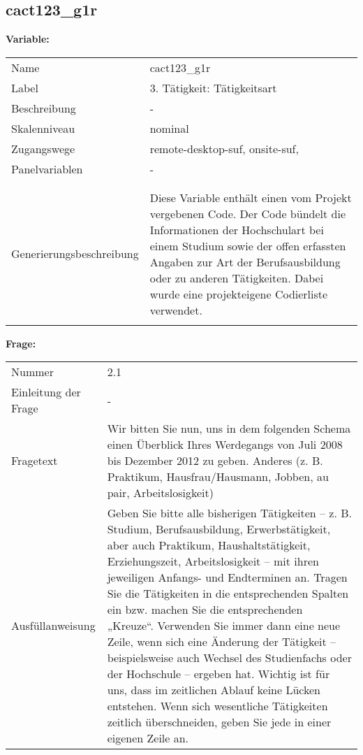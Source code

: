 	
	
	\subsection{cact123\_g1r}
	\label{subSection:cact123_g1r}

	\noindent\textbf{Variable:}\\
		\begin{tabular}{lL{11.3cm}}
			\label{tableVariable:cact123_g1r}
			Name & cact123\_g1r \\
			Label & 3. Tätigkeit: Tätigkeitsart \\
			Beschreibung & - \\
			Skalenniveau & nominal \\
			Zugangswege &
				remote-desktop-suf,
				onsite-suf,
 \\
			Panelvariablen & -
			 \\
			 \\
 \\
					Generierungsbeschreibung & Diese Variable enthält einen vom Projekt vergebenen Code. Der Code bündelt die  Informationen der Hochschulart bei einem Studium sowie der  offen erfassten Angaben zur Art der Berufsausbildung oder zu anderen Tätigkeiten. Dabei wurde eine projekteigene Codierliste verwendet.
				 \\	
			 \\
		\end{tabular}

		\vspace*{1 cm}
		\noindent\textbf{Frage:}\\
		\begin{tabular}{lL{11.3cm}}
			\label{tableQuestion:cact123_g1r}
			Nummer & 2.1 \\
			Einleitung der Frage & - \\
			Fragetext & Wir bitten Sie nun, uns in dem folgenden Schema einen Überblick Ihres Werdegangs von Juli 2008 bis Dezember 2012 zu geben.
Anderes
(z. B. Praktikum, Hausfrau/Hausmann, Jobben, au pair, Arbeitslosigkeit) \\
			Ausfüllanweisung & Geben Sie bitte alle bisherigen Tätigkeiten – z. B. Studium, Berufsausbildung, Erwerbstätigkeit, aber auch Praktikum, Haushaltstätigkeit,
Erziehungszeit, Arbeitslosigkeit – mit ihren jeweiligen Anfangs- und Endterminen an. Tragen Sie die Tätigkeiten in die entsprechenden Spalten ein bzw. machen Sie die entsprechenden „Kreuze“. Verwenden Sie immer dann eine neue Zeile, wenn sich eine Änderung der Tätigkeit – beispielsweise auch Wechsel des Studienfachs oder der Hochschule – ergeben hat. Wichtig ist für uns, dass im zeitlichen Ablauf keine Lücken entstehen. Wenn sich wesentliche Tätigkeiten zeitlich überschneiden, geben Sie jede in einer eigenen Zeile an. \\
		\end{tabular}





